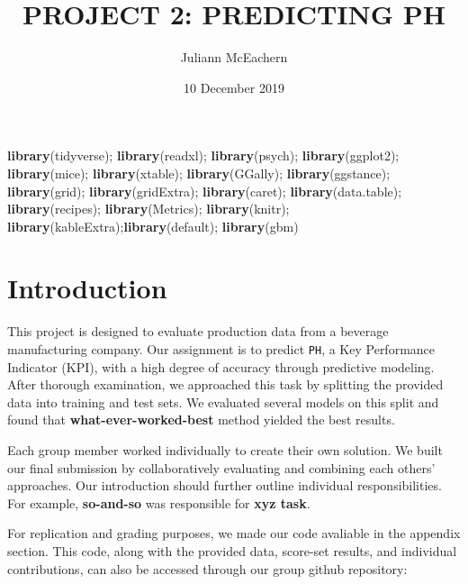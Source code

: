 \documentclass[]{report}
\title{PROJECT 2: PREDICTING PH}
\author{Juliann McEachern}
\date{10 December 2019}
\newenvironment{Shaded}{\begin{snugshade}}{\end{snugshade}}
\newcommand{\KeywordTok}[1]{\textcolor[rgb]{0.13,0.29,0.53}{\textbf{#1}}}
\newcommand{\NormalTok}[1]{#1}
\begin{document}
\maketitle

{
\setcounter{tocdepth}{1}
\tableofcontents
}
\begin{Shaded}
\begin{Highlighting}[]
\KeywordTok{library}\NormalTok{(tidyverse); }\KeywordTok{library}\NormalTok{(readxl); }\KeywordTok{library}\NormalTok{(psych); }\KeywordTok{library}\NormalTok{(ggplot2); }\KeywordTok{library}\NormalTok{(mice); }\KeywordTok{library}\NormalTok{(xtable); }\KeywordTok{library}\NormalTok{(GGally); }\KeywordTok{library}\NormalTok{(ggstance); }\KeywordTok{library}\NormalTok{(grid); }\KeywordTok{library}\NormalTok{(gridExtra); }\KeywordTok{library}\NormalTok{(caret); }\KeywordTok{library}\NormalTok{(data.table); }\KeywordTok{library}\NormalTok{(recipes); }\KeywordTok{library}\NormalTok{(Metrics); }\KeywordTok{library}\NormalTok{(knitr); }\KeywordTok{library}\NormalTok{(kableExtra);}\KeywordTok{library}\NormalTok{(default); }\KeywordTok{library}\NormalTok{(gbm)}
\end{Highlighting}
\end{Shaded}

\thispagestyle{empty}
\newpage
\clearpage
{}

\hypertarget{intro}{%
\chapter*{Introduction}\label{intro}}

This project is designed to evaluate production data from a beverage
manufacturing company. Our assignment is to predict \texttt{PH}, a Key
Performance Indicator (KPI), with a high degree of accuracy through
predictive modeling. After thorough examination, we approached this task
by splitting the provided data into training and test sets. We evaluated
several models on this split and found that
\textbf{what-ever-worked-best} method yielded the best results.

Each group member worked individually to create their own solution. We
built our final submission by collaboratively evaluating and combining
each others' approaches. Our introduction should further outline
individual responsibilities. For example, \textbf{so-and-so} was
responsible for \textbf{xyz task}.

For replication and grading purposes, we made our code avaliable in the
appendix section. This code, along with the provided data, score-set
results, and individual contributions, can also be accessed through our
group github repository:
\end{document}
